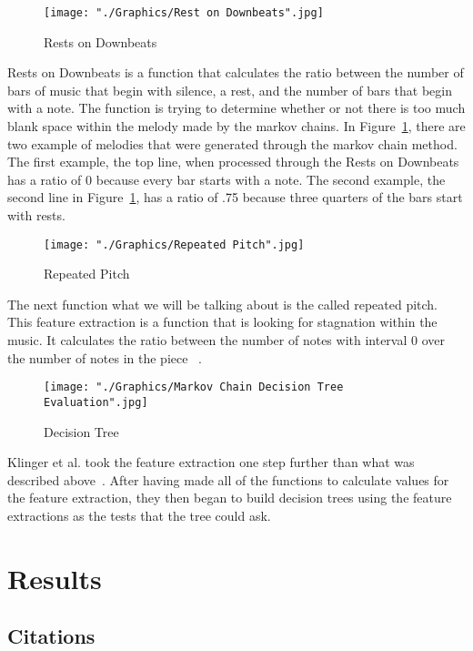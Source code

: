 \documentclass{sig-alternate}
\begin{document}
\begin{figure}[H]
\texttt{[image: "./Graphics/Rest on Downbeats".jpg]}
\caption{Rests on Downbeats}
\label{fig:restsondownbeats}
\end{figure}

	Rests on Downbeats is a function that calculates the ratio between the number of bars of music that begin with silence, a rest, and the number of bars that begin with a note. The function is trying to determine whether or not there is too much blank space within the melody made by the markov chains. In Figure~\ref{fig:restsondownbeats}, there are two example of melodies that were generated through the markov chain method. The first example, the top line, when processed through the Rests on Downbeats has a ratio of 0 because every bar starts with a note. The second example, the second line in Figure~\ref{fig:restsondownbeats}, has a ratio of .75 because three quarters of the bars start with rests.

\begin{figure}[H]
\texttt{[image: "./Graphics/Repeated Pitch".jpg]}
\caption{Repeated Pitch}
\label{fig:repeatedpitch}
\end{figure}

	The next function what we will be talking about is the called repeated pitch. This feature extraction is a function that is looking for stagnation within the music. It calculates the ratio between the number of notes with interval 0 over the number of notes in the piece ~\cite{cit:Klinger}.

\begin{figure}[H]
\texttt{[image: "./Graphics/Markov Chain Decision Tree Evaluation".jpg]}
\caption{Decision Tree}
\label{fig:DecisionTreeEval}
\end{figure}

Klinger et al. took the feature extraction one step further than what was described above~\cite{cit:Klinger}. After having made all of the functions to calculate values for the feature extraction, they then began to build decision trees using the feature extractions as the tests that the tree could ask. 

\section{Results}
\label{sec:results}


\subsection{Citations}
\label{sec:citations}
\end{document}
